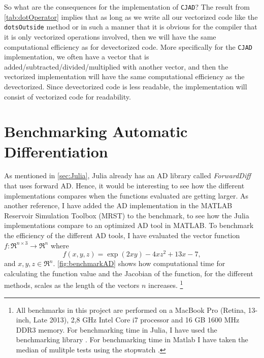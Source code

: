 So what are the consequences for the implementation of \texttt{CJAD}? The result from \autoref{tab:dotOperator} implies that as long as we write all our vectorized code like the \texttt{dotsOutside} method or in such a manner that it is obvious for the compiler that it is only vectorized operations involved, then we will have the same computational efficiency as for devectorized code. More specifically for the \texttt{CJAD} implementation, we often have a vector that is added/subtracted/divided/multiplied with another vector, and then the vectorized implementation will have the same computational efficiency as the devectorized. Since devectorized code is less readable, the implementation will consist of vectorized code for readability.

\section{Benchmarking Automatic Differentiation}
As mentioned in \autoref{sec:Julia}, Julia already has an AD library called \textit{ForwardDiff} \emph{\citep{ForwardDiff}} that uses forward AD. Hence, it would be interesting to see how the different implementations compares when the functions evaluated are getting larger. As another reference, I have added the AD implementation in the MATLAB Reservoir Simulation Toolbox (MRST) \emph{\citep{mrstHomepage}} to the benchmark, to see how the Julia implementations compare to an optimized AD tool in MATLAB. To benchmark the efficiency of the different AD tools, I have evaluated the vector function $f: \Re^{n\times 3} \rightarrow \Re^n $ where
\begin{equation}
\label{eq:benchmarkFunction}
f(x,y,z)  = \exp(2xy) - 4xz^2 + 13x - 7,
\end{equation}
and $x,y,z \in \Re^n$. \autoref{fig:benchmarkAD} shows how computational time for calculating the function value and the Jacobian of the function, for the different methods, scales as the length of the vectors $n$ increases. \footnote{All benchmarks in this project are performed on a MacBook Pro (Retina, 13-inch, Late 2013), 2,8 GHz Intel Core i7 processor and 16 GB 1600 MHz DDR3 memory. For benchmarking time in Julia, I have used the benchmarking library \emph{\cite{BenchmarkTools}}. For benchmarking time in Matlab I have taken the median of mulitple tests using the stopwatch \emph{\cite{TicToc}}.}

